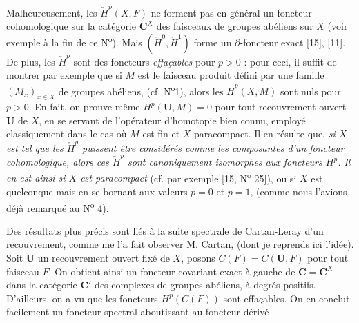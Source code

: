 Malheureusement, les $\check H^p(X,F)$ ne forment pas en général un foncteur
cohomologique sur la catégorie $\mathbf C^X$ des faisceaux de groupes abéliens sur $X$
(voir exemple à la fin de ce N\textsuperscript{o}).
Mais $(\check H^0,\check H^1)$ forme un $\partial$-foncteur exact [15], [11].
De plus, les $\check H^p$ sont des foncteurs \textit{effaçables} pour $p>0$ :
pour ceci, il suffit de montrer par exemple que si $M$ est le faisceau produit
défini par une famille $(M_x)_{x\in X}$ de groupes abéliens, (cf.
N\textsuperscript{o}1), alors les $\check H^p(X,M)$ sont nuls pour $p>0$. En
fait, on prouve même $H^p(\mathbf U,M)=0$ pour tout recouvrement ouvert
$\mathbf U$ de $X$, en se servant de l'opérateur d'homotopie bien connu,
employé classiquement dans le cas où $M$ est fin et $X$ paracompact.
Il en résulte que, \textit{si $X$ est tel que les $\check H^p$ puissent être
considérés comme les composantes d'un foncteur cohomologique, alors ces
$\check H^p$ sont canoniquement isomorphes aux foncteurs $H^p$. Il en est
ainsi si $X$ est paracompact} (cf. par exemple [15,
N\textsuperscript{o} 25]), ou si $X$ est quelconque mais en se bornant aux
valeurs $p=0$ et $p=1$, (comme nous l'avions déjà remarqué au
N\textsuperscript{o} 4).

Des résultats plus précis sont liés à la suite spectrale de Cartan-Leray d'un
recouvrement, comme me l'a fait observer M. Cartan, (dont je reprends ici
l'idée). Soit $\mathbf U$ un recouvrement ouvert fixé de $X$, posons
$C(F)=C(\mathbf U,F)$ pour tout faisceau $F$. On obtient ainsi un foncteur
covariant exact à gauche de $\mathbf C=\mathbf C^X$ dans la catégorie $\mathbf C'$ des complexes de
groupes abéliens, à degrés positifs. D'ailleurs, on a vu que les foncteurs
$H^p(C(F))$ sont effaçables. On en conclut facilement un foncteur spectral
aboutissant au foncteur dérivé

